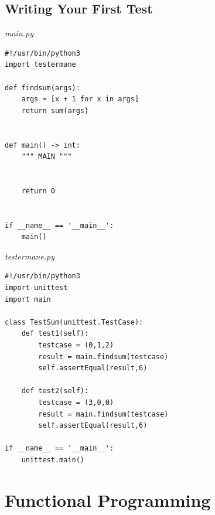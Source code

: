 \documentclass{report}
\begin{document}
    
    \bigbreak \noindent \bigbreak \noindent 
    \subsection{Writing Your First Test}
    \bigbreak \noindent 
    \begin{minipage}{0.47\textwidth}
        \textit{main.py}
    \begin{verbatim}
#!/usr/bin/python3
import testermane

def findsum(args):
    args = [x + 1 for x in args]
    return sum(args)


def main() -> int:
    """ MAIN """


    return 0


if __name__ == '__main__':
    main()

    \end{verbatim}
    \end{minipage}
    \begin{minipage}{0.47\textwidth}
    \textit{testermane.py}
\begin{verbatim}
#!/usr/bin/python3
import unittest
import main

class TestSum(unittest.TestCase):
    def test1(self):
        testcase = (0,1,2)
        result = main.findsum(testcase)
        self.assertEqual(result,6)

    def test2(self):
        testcase = (3,0,0)
        result = main.findsum(testcase)
        self.assertEqual(result,6)

if __name__ == '__main__':
    unittest.main()

\end{verbatim}
    \end{minipage}
    \pagebreak \bigbreak \noindent 
    \section{Functional Programming}
    \bigbreak \noindent 












    
\end{document}
